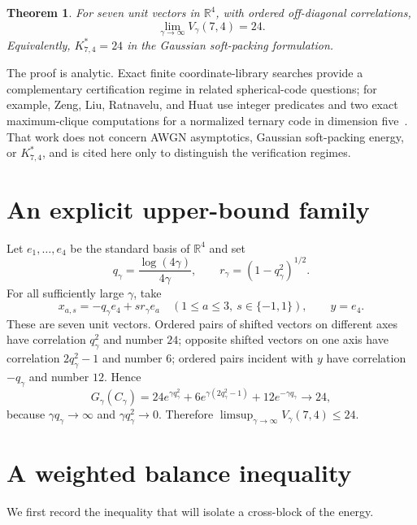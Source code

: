 \documentclass[11pt]{article}
\newtheorem{theorem}{Theorem}
\newcommand{\R}{\mathbb{R}}
\begin{document}
\begin{theorem}\label{thm:main}
For seven unit vectors in $\R^4$, with ordered off-diagonal correlations,
\[
 \lim_{\gamma\to\infty}V_\gamma(7,4)=24.
\]
Equivalently, $K^*_{7,4}=24$ in the Gaussian soft-packing formulation.
\end{theorem}

The proof is analytic.  Exact finite coordinate-library searches provide a
complementary certification regime in related spherical-code questions; for
example, Zeng, Liu, Ratnavelu, and Huat use integer predicates and two exact
maximum-clique computations for a normalized ternary code in dimension
five~\cite{ZengEtAl2026}.  That work does not concern AWGN asymptotics,
Gaussian soft-packing energy, or $K^*_{7,4}$, and is cited here only to
distinguish the verification regimes.

\section{An explicit upper-bound family}

Let $e_1,\ldots,e_4$ be the standard basis of $\R^4$ and set
\[
 q_\gamma=\frac{\log(4\gamma)}{4\gamma},
 \qquad r_\gamma=(1-q_\gamma^2)^{1/2}.
\]
For all sufficiently large $\gamma$, take
\begin{equation}\label{eq:construction}
 x_{a,s}=-q_\gamma e_4+s r_\gamma e_a
 \quad(1\le a\le3,\ s\in\{-1,1\}),
 \qquad y=e_4.
\end{equation}
These are seven unit vectors.  Ordered pairs of shifted vectors on different
axes have correlation $q_\gamma^2$ and number $24$; opposite shifted vectors
on one axis have correlation $2q_\gamma^2-1$ and number $6$; ordered pairs
incident with $y$ have correlation $-q_\gamma$ and number $12$.  Hence
\begin{equation}\label{eq:upperenergy}
 G_\gamma(C_\gamma)
 =24e^{\gamma q_\gamma^2}
  +6e^{\gamma(2q_\gamma^2-1)}
  +12e^{-\gamma q_\gamma}\longrightarrow24,
\end{equation}
because $\gamma q_\gamma\to\infty$ and
$\gamma q_\gamma^2\to0$.  Therefore
$\limsup_{\gamma\to\infty}V_\gamma(7,4)\le24$.

\section{A weighted balance inequality}

We first record the inequality that will isolate a cross-block of the energy.
\end{document}
